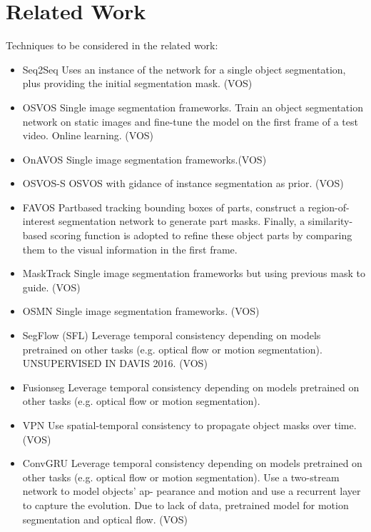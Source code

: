\documentclass[10pt,twocolumn,letterpaper]{article}
\begin{document}
 \section{Related Work}
\iffalse
Techniques to be considered in the related work:
\begin{itemize}
    \item Seq2Seq \cite{xu2018youtube} Uses an instance of the network for a single object segmentation, plus providing the initial segmentation mask. (VOS)
    \item OSVOS \cite{caelles2017one} Single image segmentation frameworks. Train an object segmentation network on static images and fine-tune the model on the first frame of a test video. Online learning. (VOS)
    \item OnAVOS \cite{voigtlaender2017online} Single image segmentation frameworks.(VOS)
    \item OSVOS-S \cite{maninis2018video} OSVOS with gidance of instance segmentation as prior. (VOS)
    \item FAVOS \cite{Cheng_favos_2018} Partbased tracking bounding boxes of parts, construct a region-of-interest segmentation network to generate part masks. Finally, a similarity-based scoring function is adopted to refine these object parts by comparing them to the visual information in the first frame.
    \item MaskTrack \cite{perazzi2017learning} Single image segmentation frameworks but using previous mask to guide. (VOS)
    \item OSMN \cite{yang2018efficient} Single image segmentation frameworks. (VOS)
    \item SegFlow (SFL) \cite{cheng2017segflow} Leverage temporal consistency depending on models pretrained on other tasks (e.g. optical flow or motion segmentation). UNSUPERVISED IN DAVIS 2016. (VOS)
    \item Fusionseg \cite{jain2017fusionseg} Leverage temporal consistency depending on models pretrained on other tasks (e.g. optical flow or motion segmentation). 
    \item VPN \cite{jampani2017video} Use spatial-temporal consistency to propagate object masks over time. (VOS)
    \item ConvGRU \cite{tokmakov2017learning} Leverage temporal consistency depending on models pretrained on other tasks (e.g. optical flow or motion segmentation). Use a two-stream network to model objects’ ap- pearance and motion and use a recurrent layer to capture the evolution. Due to lack of data, pretrained model for motion segmentation and optical flow. (VOS)

\end{itemize}
\end{document}
